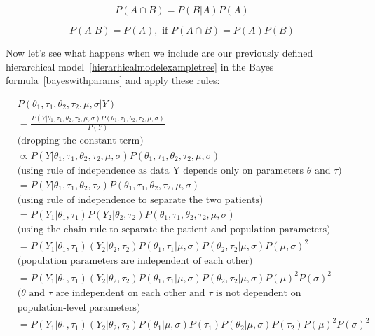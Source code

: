\documentclass[12pt,a4paper,leqno]{report}
\theoremstyle{plain}
\theoremstyle{definition}
\theoremstyle{remark}
\begin{document}
\begin{equation}\label{chainrule}
    P(A \cap B) = P(B|A)P(A)
\end{equation}

\begin{equation}\label{ruleofindependence}
    P(A|B) = P(A), \text{ if } P(A \cap B) = P(A)P(B)
\end{equation}
\smallskip

Now let's see what happens when we include are our previously defined hierarchical
model\ \ref{hierarhicalmodelexampletree} in the Bayes formula\
\ref{bayeswithparams} and apply these rules:

\begin{equation*}\label{}
    \begin{aligned}\label{conjugatebayesrule}
        &P(\theta_1,\tau_1,\theta_2,\tau_2,\mu,\sigma | Y) \\
        &= \frac{P(Y | \theta_1,\tau_1,\theta_2,\tau_2,\mu,\sigma)P(\theta_1,\tau_1,\theta_2,\tau_2,\mu,\sigma)}{P(Y)} \\
        &\text{(dropping the constant term)} \\
        &\propto P(Y | \theta_1,\tau_1,\theta_2,\tau_2,\mu,\sigma)P(\theta_1,\tau_1,\theta_2,\tau_2,\mu,\sigma) \\
        &\text{(using rule of independence as data Y depends only on parameters $\theta$ and $\tau$)} \\
        &= P(Y | \theta_1,\tau_1,\theta_2,\tau_2)P(\theta_1,\tau_1,\theta_2,\tau_2,\mu,\sigma) \\
        &\text{(using rule of independence to separate the two patients)} \\
        &= P(Y_1 | \theta_1,\tau_1)P(Y_2 | \theta_2,\tau_2)P(\theta_1,\tau_1,\theta_2,\tau_2,\mu,\sigma) \\
        &\text{(using the chain rule to separate the patient and population parameters)} \\
        &= P(Y_1|\theta_1,\tau_1)(Y_2|\theta_2, \tau_2)P(\theta_1,\tau_1|\mu,\sigma)P(\theta_2,\tau_2|\mu,\sigma)P(\mu, \sigma)^2 \\
        &\text{(population parameters are independent of each other)} \nonumber \\
        &= P(Y_1|\theta_1,\tau_1)(Y_2|\theta_2, \tau_2)P(\theta_1,\tau_1|\mu,\sigma)P(\theta_2,\tau_2|\mu,\sigma)P(\mu)^2P(\sigma)^2 \\
        &\text{($\theta$ and $\tau$ are independent on each other and $\tau$ is not dependent on} \\
        & \text{population-level parameters)} \\
        &= P(Y_1|\theta_1,\tau_1)(Y_2|\theta_2, \tau_2)P(\theta_1|\mu,\sigma)P(\tau_1)P(\theta_2|\mu,\sigma)P(\tau_2)P(\mu)^2P(\sigma)^2 \nonumber
    \end{aligned}
\end{equation*}
\end{document}
